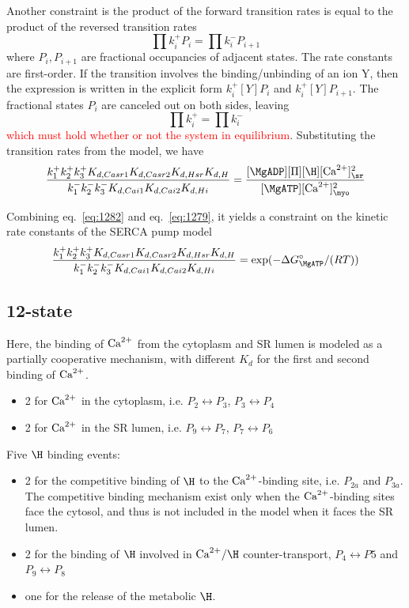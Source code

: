 Another constraint is the product of the forward transition rates is
equal to the product of the reversed transition rates
\begin{equation}
  \label{eq:1277}
  \prod k_i^+P_i = \prod k^-_i P_{i+1}
\end{equation}
where $P_i, P_{i+1}$ are fractional occupancies of adjacent
states. The rate constants are first-order.  If the transition
involves the binding/unbinding of an ion Y, then the expression is
written in the explicit form $k^+_i[Y]P_i$ and $k^+_i[Y]P_{i+1}$. The
fractional states $P_i$ are canceled out on both sides, leaving
\begin{equation}
  \label{eq:1278}
  \prod k_i^+ = \prod k^-_i 
\end{equation}
\textcolor{red}{which must hold whether or not the system in
  equilibrium}. Substituting the transition rates from the model, we
have
\begin{equation}
  \label{eq:1279}
  \frac{k^+_1k^+_2k^+_3K_{d,Casr1}K_{d,Casr2}K_{d,Hsr}K_{d,H}}{k^-_1k^-_2k^-_3K_{d,Cai1}K_{d,Cai2}K_{d,Hi}}
  = \frac{[\MgADP][\Pi][\H][\Ca]^2_\sr}{[\MgATP][\Ca]^2_\myo}
\end{equation}

Combining eq.~\eqref{eq:1282} and eq.~\eqref{eq:1279}, it yields a
constraint on the kinetic rate constants of the SERCA pump model
\begin{equation}
  \label{eq:1283}
  \frac{k^+_1k^+_2k^+_3K_{d,Casr1}K_{d,Casr2}K_{d,Hsr}K_{d,H}}{k^-_1k^-_2k^-_3K_{d,Cai1}K_{d,Cai2}K_{d,Hi}}
  =   \exp(-  \Delta G_\MgATP^\circ/(RT))
\end{equation}

\subsection{12-state}
\label{sec:12-state}

Here, the binding of ${\text{Ca}^{2+}}$ from the cytoplasm and SR lumen is modeled
as a partially cooperative mechanism, with different $K_d$ for the
first and second binding of ${\text{Ca}^{2+}}$.
\begin{itemize}
\item 2 for ${\text{Ca}^{2+}}$ in the cytoplasm, i.e. $P_2 \leftrightarrow P_3$, $P_3 \leftrightarrow P_4$
\item 2 for ${\text{Ca}^{2+}}$ in the SR lumen, i.e. $P_9 \leftrightarrow P_7$, $P_7 \leftrightarrow P_6$
\end{itemize}

Five $\H$ binding events:
\begin{itemize}
\item 2 for the competitive binding of $\H$ to the ${\text{Ca}^{2+}}$-binding site,
  i.e. $P_{2a}$ and $P_{3a}$. The competitive binding mechanism exist
  only when the ${\text{Ca}^{2+}}$-binding sites face the cytosol, and thus is not
  included in the model when it faces the SR lumen.

\item 2 for the binding of $\H$ involved in $\Ca/\H$
  counter-transport, $P_4 \leftrightarrow P5$ and $P_9 \leftrightarrow P_8$
\item one for the release of the metabolic $\H$. 
\end{itemize}

